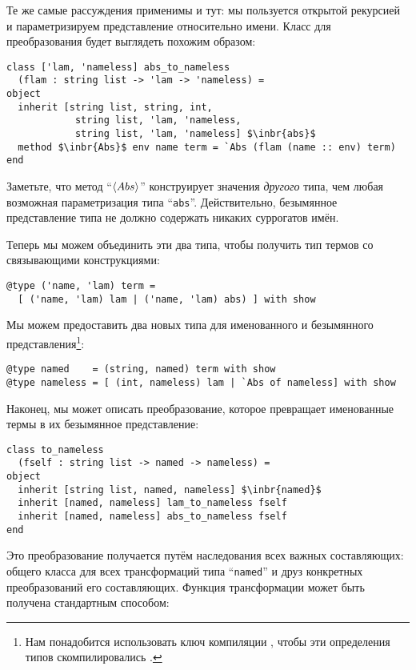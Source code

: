 Те же самые рассуждения применимы и тут: мы пользуется открытой рекурсией и параметризируем представление относительно имени.
Класс для преобразования будет выглядеть похожим образом:

\begin{lstlisting}
class ['lam, 'nameless] abs_to_nameless
  (flam : string list -> 'lam -> 'nameless) =
object
  inherit [string list, string, int,
            string list, 'lam, 'nameless,
            string list, 'lam, 'nameless] $\inbr{abs}$
  method $\inbr{Abs}$ env name term = `Abs (flam (name :: env) term)
end
\end{lstlisting}

Заметьте, что метод ``$\left<Abs\right>$'' конструирует значения \emph{другого} типа, чем любая возможная параметризация типа ``\lstinline{abs}''. Действительно, безымянное представление типа не должно содержать никаких суррогатов имён.

Теперь мы можем объединить эти два типа, чтобы получить тип термов со связывающими конструкциями:

\begin{lstlisting}
@type ('name, 'lam) term = 
  [ ('name, 'lam) lam | ('name, 'lam) abs) ] with show
\end{lstlisting}

Мы можем предоставить два новых типа для именованного и безымянного представления\footnote{Нам понадобится использовать ключ компиляции
, чтобы эти определения типов скомпилировались .}:

\begin{lstlisting}
@type named    = (string, named) term with show
@type nameless = [ (int, nameless) lam | `Abs of nameless] with show
\end{lstlisting}

Наконец, мы может описать преобразование, которое превращает именованные термы в их безымянное представление:

\begin{lstlisting}
class to_nameless
  (fself : string list -> named -> nameless) =
object
  inherit [string list, named, nameless] $\inbr{named}$
  inherit [named, nameless] lam_to_nameless fself
  inherit [named, nameless] abs_to_nameless fself
end
\end{lstlisting}

Это преобразование получается путём наследования всех важных составляющих: общего класса для всех трансформаций типа ``\lstinline{named}'' 
и друз конкретных преобразований его составляющих. Функция трансформации может быть получена стандартным способом:


